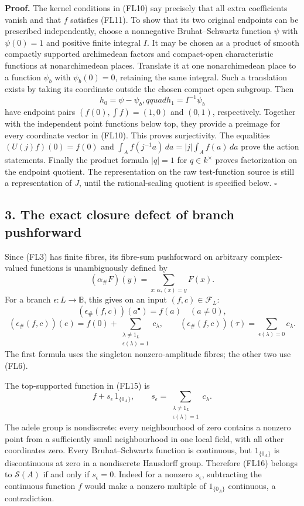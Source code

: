 \documentclass[
  10pt,
]{article}
\begin{document}
\textbf{Proof.} The kernel conditions in (FL10) say precisely that all
extra coefficients vanish and that \(f\) satisfies (FL11). To show that
its two original endpoints can be prescribed independently, choose a
nonnegative Bruhat--Schwartz function \(\psi\) with \(\psi(0)=1\) and
positive finite integral \(I\). It may be chosen as a product of smooth
compactly supported archimedean factors and compact-open characteristic
functions at nonarchimedean places. Translate it at one nonarchimedean
place to a function \(\psi_b\) with \(\psi_b(0)=0\), retaining the same
integral. Such a translation exists by taking its coordinate outside the
chosen compact open subgroup. Then \[
h_0=\psi-\psi_b,qquad h_1=I^{-1}\psi_b
\tag{FL13}
\] have endpoint pairs \((f(0),\int f)=(1,0)\) and \((0,1)\),
respectively. Together with the independent point functions below top,
they provide a preimage for every coordinate vector in (FL10). This
proves surjectivity. The equalities \((U(j)f)(0)=f(0)\) and
\(\int_A f(j^{-1}a)\,da=|j|\int_A f(a)\,da\) prove the action
statements. Finally the product formula \(|q|=1\) for \(q\in k^\times\)
proves factorization on the endpoint quotient. The representation on the
raw test-function source is still a representation of \(J\), until the
rational-scaling quotient is specified below. \(\square\)

\subsection{3. The exact closure defect of branch
pushforward}\label{the-exact-closure-defect-of-branch-pushforward}

Since (FL3) has finite fibres, its fibre-sum pushforward on arbitrary
complex-valued functions is unambiguously defined by \[
(\alpha_\#F)(y)=\sum_{x:\alpha_*(x)=y}F(x).
\tag{FL14}
\] For a branch \(\epsilon:L\to\mathbb B\), this gives on an input
\((f,c)\in\mathcal F_L\): \[
(\epsilon_\#(f,c))(a^\bullet)=f(a)\quad(a\ne0),
\] \[
(\epsilon_\#(f,c))(e)=f(0)+
\sum_{\substack{\lambda\ne1_L\\\epsilon(\lambda)=1}}c_\lambda,
\qquad
(\epsilon_\#(f,c))(\tau)=
\sum_{\epsilon(\lambda)=0}c_\lambda.
\tag{FL15}
\] The first formula uses the singleton nonzero-amplitude fibres; the
other two use (FL6).

The top-supported function in (FL15) is \[
f+s_\epsilon\,1_{\{0_A\}},\qquad
s_\epsilon=\sum_{\substack{\lambda\ne1_L\\\epsilon(\lambda)=1}}c_\lambda.
\tag{FL16}
\] The adele group is nondiscrete: every neighbourhood of zero contains
a nonzero point from a sufficiently small neighbourhood in one local
field, with all other coordinates zero. Every Bruhat--Schwartz function
is continuous, but \(1_{\{0_A\}}\) is discontinuous at zero in a
nondiscrete Hausdorff group. Therefore (FL16) belongs to
\(\mathcal S(A)\) if and only if \(s_\epsilon=0\). Indeed for a nonzero
\(s_\epsilon\), subtracting the continuous function \(f\) would make a
nonzero multiple of \(1_{\{0_A\}}\) continuous, a contradiction.
\end{document}
